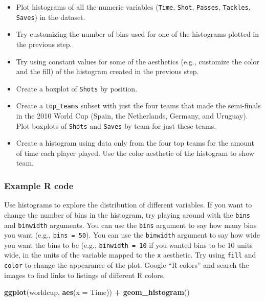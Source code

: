 \documentclass[]{book}
\makeatletter
\newenvironment{Shaded}{\begin{snugshade}}{\end{snugshade}}
\newcommand{\KeywordTok}[1]{\textcolor[rgb]{0.13,0.29,0.53}{\textbf{#1}}}
\newcommand{\DataTypeTok}[1]{\textcolor[rgb]{0.13,0.29,0.53}{#1}}
\newcommand{\StringTok}[1]{\textcolor[rgb]{0.31,0.60,0.02}{#1}}
\newcommand{\OperatorTok}[1]{\textcolor[rgb]{0.81,0.36,0.00}{\textbf{#1}}}
\newcommand{\NormalTok}[1]{#1}
\providecommand{\tightlist}{%
  \setlength{\itemsep}{0pt}\setlength{\parskip}{0pt}}
\newenvironment{kframe}{%
\medskip{}
\setlength{\fboxsep}{.8em}
 \def\at@end@of@kframe{}%
 \ifinner\ifhmode%
  \def\at@end@of@kframe{\end{minipage}}%
  \begin{minipage}{\columnwidth}%
 \fi\fi%
 \def\FrameCommand##1{\hskip\@totalleftmargin \hskip-\fboxsep
 \colorbox{shadecolor}{##1}\hskip-\fboxsep
     \hskip-\linewidth \hskip-\@totalleftmargin \hskip\columnwidth}%
 \MakeFramed {\advance\hsize-\width
   \@totalleftmargin\z@ \linewidth\hsize
   \@setminipage}}%
 {\par\unskip\endMakeFramed%
 \at@end@of@kframe}
\renewenvironment{Shaded}{\begin{kframe}}{\end{kframe}}
\theoremstyle{definition}
\theoremstyle{definition}
\theoremstyle{definition}
\theoremstyle{remark}
\makeatother
\begin{document}
\begin{itemize}
\tightlist
\item
  Plot histograms of all the numeric variables (\texttt{Time},
  \texttt{Shot}, \texttt{Passes}, \texttt{Tackles}, \texttt{Saves}) in
  the dataset.
\item
  Try customizing the number of bins used for one of the histograms
  plotted in the previous step.
\item
  Try using constant values for some of the aesthetics (e.g., customize
  the color and the fill) of the histogram created in the previous step.
\item
  Create a boxplot of \texttt{Shots} by position.
\item
  Create a \texttt{top\_teams} subset with just the four teams that made
  the semi-finals in the 2010 World Cup (Spain, the Netherlands,
  Germany, and Uruguay). Plot boxplots of \texttt{Shots} and
  \texttt{Saves} by team for just these teams.
\item
  Create a histogram using data only from the four top teams for the
  amount of time each player played. Use the color aesthetic of the
  histogram to show team.
\end{itemize}

\subsubsection{Example R code}\label{example-r-code-5}

Use histograms to explore the distribution of different variables. If
you want to change the number of bins in the histogram, try playing
around with the \texttt{bins} and \texttt{binwidth} arguments. You can
use the \texttt{bins} argument to say how many bins you want (e.g.,
\texttt{bins\ =\ 50}). You can use the \texttt{binwidth} argument to say
how wide you want the bins to be (e.g., \texttt{binwidth\ =\ 10} if you
wanted bins to be 10 units wide, in the units of the variable mapped to
the \texttt{x} aesthetic. Try using \texttt{fill} and \texttt{color} to
change the appearance of the plot. Google ``R colors'' and search the
images to find links to listings of different R colors.

\begin{Shaded}
\begin{Highlighting}[]
\KeywordTok{ggplot}\NormalTok{(worldcup, }\KeywordTok{aes}\NormalTok{(}\DataTypeTok{x =}\NormalTok{ Time)) }\OperatorTok{+}\StringTok{ }
\StringTok{  }\KeywordTok{geom_histogram}\NormalTok{()}
\end{Highlighting}
\end{Shaded}
\end{document}
